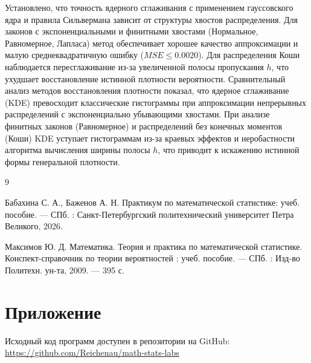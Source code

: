 \documentclass[a4paper, 14pt]{extarticle}
\begin{document}
Установлено, что точность ядерного сглаживания с применением гауссовского ядра и правила Сильвермана зависит от структуры хвостов распределения. Для законов с экспоненциальными и финитными хвостами (Нормальное, Равномерное, Лапласа) метод обеспечивает хорошее качество аппроксимации и малую среднеквадратичную ошибку ($MSE \le 0.0020$). Для распределения Коши наблюдается пересглаживание из-за увеличенной полосы пропускания $h$, что ухудшает восстановление истинной плотности вероятности. Сравнительный анализ методов восстановления плотности показал, что ядерное сглаживание (KDE) превосходит классические гистограммы при аппроксимации непрерывных распределений с экспоненциально убывающими хвостами. При анализе финитных законов (Равномерное) и распределений без конечных моментов (Коши) KDE уступает гистограммам из-за краевых эффектов и неробастности алгоритма вычисления ширины полосы $h$, что приводит к искажению истинной формы генеральной плотности.
\renewcommand{\refname}{\thesection\ Список литературы}

\begin{thebibliography}{9}

    Бабахина С. А., Баженов А. Н. Практикум по математической статистике: учеб. пособие. — СПб. : Санкт-Петербургский политехнический университет Петра Великого, 2026. 

    Максимов Ю. Д. Математика. Теория и практика по математической статистике. Конспект-справочник по теории вероятностей : учеб. пособие. — СПб. : Изд-во Политехн. ун-та, 2009. — 395 с. 

\end{thebibliography}

\section{Приложение}

Исходный код программ доступен в репозитории на GitHub: \\
\url{https://github.com/Reichenau/math-stats-labs}
 
\end{document}
